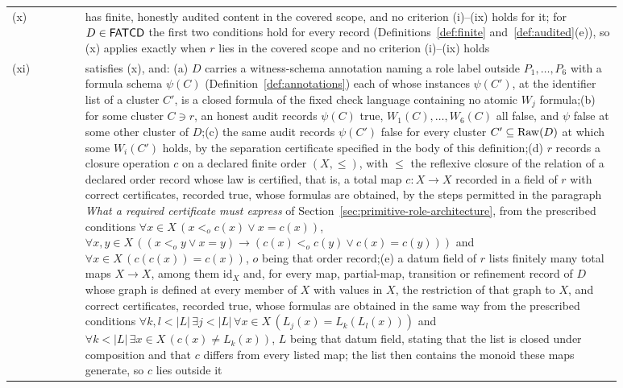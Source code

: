 \begin{longtable}{@{}l>{\raggedright\arraybackslash}p{0.88\linewidth}@{}}
(x) & has finite, honestly audited content in the covered scope, and no criterion (i)--(ix) holds for it; for \(D\in\mathsf{FATCD}{}\) the first two conditions hold for every record (Definitions~\ref{def:finite} and~\ref{def:audited}(e)), so (x) applies exactly when \(r\) lies in the covered scope and no criterion (i)--(ix) holds \\
(xi) & satisfies (x), and: (a) \(D\) carries a witness-schema annotation naming a role label outside \(P_1,\dots,P_6\) with a formula schema \(\psi(C)\) (Definition~\ref{def:annotations}) each of whose instances \(\psi(C')\), at the identifier list of a cluster \(C'\), is a closed formula of the fixed check language containing no atomic \(W_j\) formula;\newline (b) for some cluster \(C\ni r\), an honest audit records \(\psi(C)\) true, \(W_1(C),\dots,W_6(C)\) all false, and \(\psi\) false at some other cluster of \(D\);\newline (c) the same audit records \(\psi(C')\) false for every cluster \(C'\subseteq\operatorname{Raw}\!\left(D\right)\) at which some \(W_i(C')\) holds, by the separation certificate specified in the body of this definition;\newline (d) \(r\) records a closure operation \(c\) on a declared finite order \((X,\le)\), with \(\le\) the reflexive closure of the relation of a declared order record whose law is certified, that is, a total map \(c:X\to X\) recorded in a field of \(r\) with correct certificates, recorded true, whose formulas are obtained, by the steps permitted in the paragraph \emph{What a required certificate must express} of Section~\ref{sec:primitive-role-architecture}, from the prescribed conditions \(\forall x\in X\,(x<_o c(x)\vee x=c(x))\), \(\forall x,y\in X\,((x<_o y\vee x=y)\to(c(x)<_o c(y)\vee c(x)=c(y)))\) and \(\forall x\in X\,(c(c(x))=c(x))\), \(o\) being that order record;\newline (e) a datum field of \(r\) lists finitely many total maps \(X\to X\), among them \(\mathrm{id}_X\) and, for every map, partial-map, transition or refinement record of \(D\) whose graph is defined at every member of \(X\) with values in \(X\), the restriction of that graph to \(X\), and correct certificates, recorded true, whose formulas are obtained in the same way from the prescribed conditions \(\forall k,l<|L|\,\exists j<|L|\,\forall x\in X\,(L_j(x)=L_k(L_l(x)))\) and \(\forall k<|L|\,\exists x\in X\,(c(x)\neq L_k(x))\), \(L\) being that datum field, stating that the list is closed under composition and that \(c\) differs from every listed map; the list then contains the monoid these maps generate, so \(c\) lies outside it \\
\bottomrule
\end{longtable}
\endgroup

